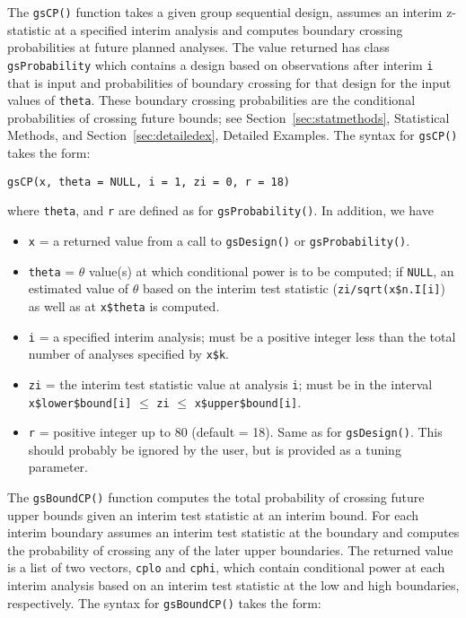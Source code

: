The \texttt{gsCP()} function takes a given group sequential design, assumes 
an interim z-statistic at a specified interim analysis and computes 
boundary crossing probabilities at future planned analyses. The value 
returned has class \texttt{gsProbability} which contains a design based on 
observations after interim \texttt{i} that is input and probabilities of 
boundary crossing for that design for the input values of \texttt{theta}. 
These boundary crossing probabilities are the conditional probabilities of 
crossing future bounds; see Section~\ref{sec:statmethods}, Statistical Methods,
and Section~\ref{sec:detailedex}, Detailed Examples. The syntax for 
\texttt{gsCP()} takes the form:

\bigskip

\texttt{gsCP(x, theta = NULL, i = 1, zi = 0, r = 18)}

\bigskip

where \texttt{theta}, and \texttt{r} are defined as for 
\texttt{gsProbability()}. In addition, we have

\begin{itemize}
\item \texttt{x} =  a returned value from a call to \texttt{gsDesign()} or
\texttt{gsProbability()}.

\item \texttt{theta} = $\theta$ value(s) at which conditional power is to be
computed; if \texttt{NULL}, an estimated value of $\theta$ based on the interim test
statistic (\texttt{zi/sqrt(x\$n.I[i]}) as well as at \texttt{x\$theta} is computed.

\item \texttt{i} = a specified interim analysis; must be a positive integer
less than the total number of analyses specified by \texttt{x\$k}.

\item \texttt{zi} = the interim test statistic value at analysis \texttt{i};
must be in the interval 
\texttt{x\$lower\$bound[i]} $\leq$ \texttt{zi} $\leq$ \texttt{x\$upper\$bound[i]}.

\item \texttt{r} = positive integer up to 80 (default = 18). Same as for
\texttt{gsDesign()}. This should probably be ignored by the user, but is
provided as a tuning parameter.
\end{itemize}

The \texttt{gsBoundCP()} function computes the total probability of crossing 
future upper bounds given an interim test statistic at an interim bound. For 
each interim boundary 
assumes an interim test statistic at the boundary and computes the
probability of crossing any of the later upper boundaries. The returned value
is a list of two vectors, \texttt{cplo} and \texttt{cphi}, which contain
conditional power at each interim analysis based on an interim test statistic
at the low and high boundaries, respectively. The syntax for
\texttt{gsBoundCP()} takes the form:

